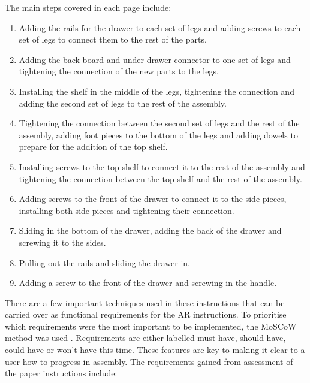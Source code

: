 \documentclass{l4proj}
\begin{document}
The main steps covered in each page include:

\begin{enumerate}
    \item Adding the rails for the drawer to each set of legs and adding screws to each set of legs to connect them to the rest of the parts.
    \item Adding the back board and under drawer connector to one set of legs and tightening the connection of the new parts to the legs.
    \item Installing the shelf in the middle of the legs, tightening the connection and adding the second set of legs to the rest of the assembly.
    \item Tightening the connection between the second set of legs and the rest of the assembly, adding foot pieces to the bottom of the legs and adding dowels to prepare for the addition of the top shelf.
    \item Installing screws to the top shelf to connect it to the rest of the assembly and tightening the connection between the top shelf and the rest of the assembly.
    \item Adding screws to the front of the drawer to connect it to the side pieces, installing both side pieces and tightening their connection.
    \item  Sliding in the bottom of the drawer, adding the back of the drawer and screwing it to the sides.
    \item Pulling out the rails and sliding the drawer in.
    \item Adding a screw to the front of the drawer and screwing in the handle.
\end{enumerate}

There are a few important techniques used in these instructions that can be carried over as functional requirements for the AR instructions. To prioritise which requirements were the most important to be implemented, the MoSCoW method was used \citep{business_chapter_2024}. Requirements are either labelled must have, should have, could have or won't have this time. These features are key to making it clear to a user how to progress in assembly. The requirements gained from assessment of the paper instructions include:
\end{document}

